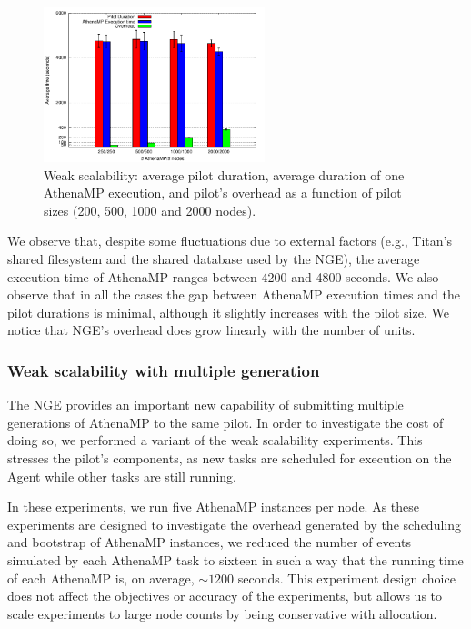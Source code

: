 \begin{figure}[!t]
        \includegraphics[height=4.5cm,width=\columnwidth]{./figures/NGE/weak1.pdf}
   	\vspace{-0.3in}
    \caption{Weak scalability: average pilot duration, average duration of one AthenaMP execution, and pilot's overhead as a function of pilot sizes (200, 500, 1000 and 2000 nodes).}
\label{fig:weakScal1a}
\end{figure}

We observe that, despite some fluctuations due to external factors (e.g.,
Titan's shared filesystem and the shared database used by the NGE), the average
execution time of AthenaMP  ranges between 4200 and 4800 seconds.  We  also
observe that in all the cases the gap between AthenaMP execution times and the
pilot durations is minimal, although it slightly increases with the pilot size.
We  notice that NGE's overhead does grow linearly with the number of units.

\subsubsection{Weak scalability with multiple generation }

The NGE provides an important new capability of submitting multiple generations
of AthenaMP to the same pilot. In order to investigate the cost of doing so, we
performed a variant of the weak scalability experiments. This stresses the
pilot's components, as new tasks are scheduled for execution on the Agent while
other tasks are still running.

In these experiments, we run five AthenaMP instances per node.  As these
experiments are designed to investigate the overhead generated by the scheduling
and bootstrap of AthenaMP instances, we reduced the number of events simulated
by each AthenaMP task to sixteen in such a way that the running time of each
AthenaMP is, on average, $\sim 1200$ seconds. This experiment design choice does
not affect the  objectives or accuracy of the experiments, but allows us to
scale experiments to large node counts by being conservative with allocation.

